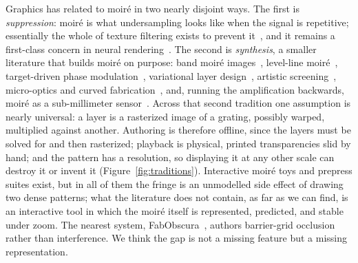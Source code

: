 Graphics has related to moir\'e in two nearly disjoint ways. The first is
\emph{suppression}: moir\'e is what undersampling looks like when the signal is
repetitive; essentially the whole of texture filtering exists to prevent
it~\cite{Heckbert1986Survey, Zwicker2002EWA}, and it remains a first-class
concern in neural rendering~\cite{Barron2021MipNeRF}. The second is
\emph{synthesis}, a smaller literature that builds moir\'e on purpose: band
moir\'e images~\cite{Hersch2004Band}, level-line moir\'e~\cite{Chosson2014Beating},
target-driven phase modulation~\cite{Tsai2013Target}, variational layer
design~\cite{Lebanon2001Variational}, artistic
screening~\cite{Ostromoukhov1995Artistic}, micro-optics and curved
fabrication~\cite{Walger2019Moire, Saberpour2020Fabrication}, and, running the
amplification backwards, moir\'e as a sub-millimeter
sensor~\cite{Qiu2023MoireTag, CamposZamora2024MoireWidgets}. Across that second
tradition one assumption is nearly universal: a layer is a rasterized image
of a grating, possibly warped, multiplied against another. Authoring is
therefore offline, since the layers must be solved for and then rasterized;
playback is physical, printed transparencies slid by hand; and the pattern has
a resolution, so displaying it at any other scale can destroy it or invent it
(Figure~\ref{fig:traditions}). Interactive moir\'e toys and prepress suites
exist, but in all of them the fringe is an unmodelled side effect of drawing
two dense patterns; what the literature does not contain, as far as we can
find, is an interactive tool in which the moir\'e itself is represented,
predicted, and stable under zoom. The nearest system,
FabObscura~\cite{Sethapakdi2025FabObscura}, authors barrier-grid occlusion
rather than interference. We think the gap is not a missing feature but a
missing representation.

